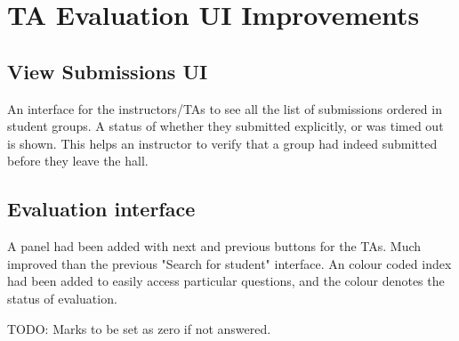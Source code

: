 \section{TA Evaluation UI Improvements}

\subsection{View Submissions UI}
An interface for the instructors/TAs to see all the list of submissions ordered in student groups.
A status of whether they submitted explicitly, or was timed out is shown. This helps an instructor to verify that a group had indeed submitted before they leave the hall.

\subsection{Evaluation interface}
A panel had been added with next and previous buttons for the TAs. Much improved than the previous "Search for student" interface. An colour coded index had been added to easily access particular questions, and the colour denotes the status of evaluation.

TODO: Marks to be set as zero if not answered.